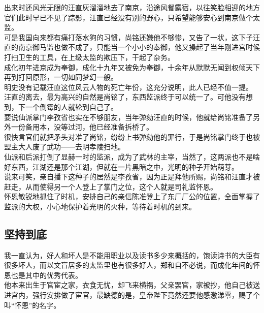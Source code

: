 \begin{multicols}{\theparacolNo}
出来时还风光无限的汪直灰溜溜地去了南京，沿途风餐露宿，以往笑脸相迎的地方官们此时早已不见了踪影，汪直已经没有别的野心，只希望能够安心到南京做个太监。\\

可是我国向来都有痛打落水狗的习惯，尚铭还嫌他不够惨，又告了一状，这下子汪直的南京御马监也做不成了，只能当一个小小的奉御，他又操起了当年刚进宫时候打扫卫生的工具，在上级太监的欺压下，干起了杂务。\\

成化初年进京成为奉御，成化十九年又被免为奉御，十余年从默默无闻到权倾天下再到打回原形，一切如同梦幻一般。\\

明史没有记载汪直这位风云人物的死亡年份，这充分说明，此人已经不值一提。\\

汪直的离去，最为高兴的自然是尚铭了，东西监派终于可以统一了。可他没有想到，下一个倒霉的人就轮到自己了。\\

要说仙派掌门李孜省也实在不够朋友，当年弹劾汪直的时候，他就给尚铭准备了另外一份备用本，没等过河，他已经准备拆桥了。\\

很快言官们就把矛头对准了尚铭，纷纷上书弹劾他的罪行，于是尚铭掌门终于也被盟主大人废了武功——去明孝陵扫地。\\

仙派和后派打倒了显赫一时的监派，成为了武林的主宰，当然了，这两派也不是啥好东西，江湖还是那个江湖，但就在一片黑暗之中，光明的种子开始萌芽。\\

说来可笑，亲自播下这种子的居然是李孜省，因为正是拜他所赐，尚铭和汪直才被赶走，从而使得另一个人登上了掌门之位，这个人就是司礼监怀恩。\\

怀恩敏锐地抓住了时机，安排自己的亲信陈准登上了东厂厂公的位置，全面掌握了监派的大权，小心地保护着光明的火种，等待着时机的到来。\\

\subsection{坚持到底}
我一直认为，好人和坏人是不能用职业以及读书多少来概括的，饱读诗书的大臣有很多坏人，而以文盲居多的太监里也有很多好人，郑和自不必说，而成化年间的怀恩也是其中的优秀代表。\\

他本来出生于官宦之家，衣食无忧，却飞来横祸，父亲罢官，家被抄，他自己被送进宫内，强行安排做了宦官，最缺德的是，皇帝陛下竟然还要他感激涕零，赐了个叫“怀恩”的名字。\\


\end{multicols}
